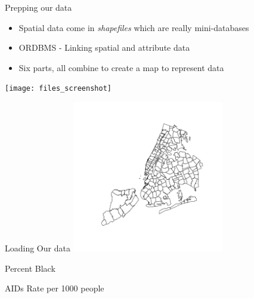 \documentclass[aspectratio = 169, 12pt]{beamer}\usepackage[]{graphicx}\usepackage[]{color}
\makeatletter
\newenvironment{kframe}{%
 \def\at@end@of@kframe{}%
 \ifinner\ifhmode%
  \def\at@end@of@kframe{\end{minipage}}%
  \begin{minipage}{\columnwidth}%
 \fi\fi%
 \def\FrameCommand##1{\hskip\@totalleftmargin \hskip-\fboxsep
 \colorbox{shadecolor}{##1}\hskip-\fboxsep
     \hskip-\linewidth \hskip-\@totalleftmargin \hskip\columnwidth}%
 \MakeFramed {\advance\hsize-\width
   \@totalleftmargin\z@ \linewidth\hsize
   \@setminipage}}%
 {\par\unskip\endMakeFramed%
 \at@end@of@kframe}
\newenvironment{knitrout}{}{} %
\makeatother
\begin{document}
\begin{frame}{Prepping our data}
\begin{itemize}
\item Spatial data come in \textit{shapefiles} which are really mini-databases
\item ORDBMS - Linking spatial and attribute data
\item Six parts, all combine to create a map to represent data
\end{itemize}
\texttt{[image: files\_screenshot]}
\end{frame}

\begin{frame}[fragile]{Loading Our data}
\begin{knitrout}\tiny
{}\color{fgcolor}
\includegraphics[width=250px]{figure/unnamed-chunk-1-1} 

\end{knitrout}
\end{frame}

\begin{frame}[fragile]{Percent Black}
\begin{knitrout}\tiny
{}\color{fgcolor}\begin{kframe}


{\ttfamily\noindent\bfseries{}}\end{kframe}
\end{knitrout}
\end{frame}

\begin{frame}[fragile]{AIDs Rate per 1000 people}
\begin{knitrout}\tiny
{}\color{fgcolor}\begin{kframe}


{\ttfamily\noindent\bfseries{}}\end{kframe}
\end{knitrout}

\end{frame}
\end{document}
